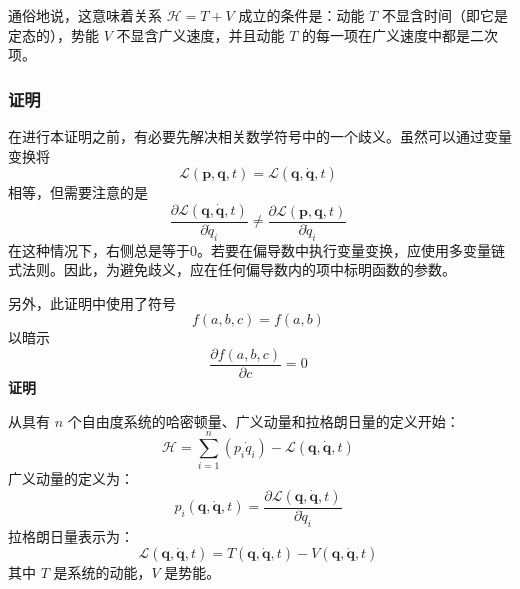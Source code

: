 通俗地说，这意味着关系 \( \mathcal{H} = T + V \) 成立的条件是：动能 \( T \) 不显含时间（即它是定态的），势能 \( V \) 不显含广义速度，并且动能 \( T \) 的每一项在广义速度中都是二次项。
\subsubsection{证明}
在进行本证明之前，有必要先解决相关数学符号中的一个歧义。虽然可以通过变量变换将 
\[
\mathcal{L}(\boldsymbol{p}, \boldsymbol{q}, t) = \mathcal{L}(\boldsymbol{q}, \boldsymbol{\dot{q}}, t)~
\]
相等，但需要注意的是
\[
\frac{\partial \mathcal{L}(\boldsymbol{q}, \boldsymbol{\dot{q}}, t)}{\partial \dot{q}_i} \neq \frac{\partial \mathcal{L}(\boldsymbol{p}, \boldsymbol{q}, t)}{\partial \dot{q}_i}~
\]
在这种情况下，右侧总是等于0。若要在偏导数中执行变量变换，应使用多变量链式法则。因此，为避免歧义，应在任何偏导数内的项中标明函数的参数。

另外，此证明中使用了符号 
\[
f(a, b, c) = f(a, b)~
\]
以暗示
\[
\frac{\partial f(a, b, c)}{\partial c} = 0~
\]
\textbf{证明}

从具有 \( n \) 个自由度系统的哈密顿量、广义动量和拉格朗日量的定义开始：
\[
\mathcal{H} = \sum_{i=1}^{n} \left( p_{i} \dot{q}_{i} \right) - \mathcal{L}(\boldsymbol{q}, \boldsymbol{\dot{q}}, t)~
\]
广义动量的定义为：
\[
p_{i}(\boldsymbol{q}, \boldsymbol{\dot{q}}, t) = \frac{\partial \mathcal{L}(\boldsymbol{q}, \boldsymbol{\dot{q}}, t)}{\partial \dot{q}_{i}}~
\]
拉格朗日量表示为：
\[
\mathcal{L}(\boldsymbol{q}, \boldsymbol{\dot{q}}, t) = T(\boldsymbol{q}, \boldsymbol{\dot{q}}, t) - V(\boldsymbol{q}, \boldsymbol{\dot{q}}, t)~
\]
其中 \( T \) 是系统的动能，\( V \) 是势能。

